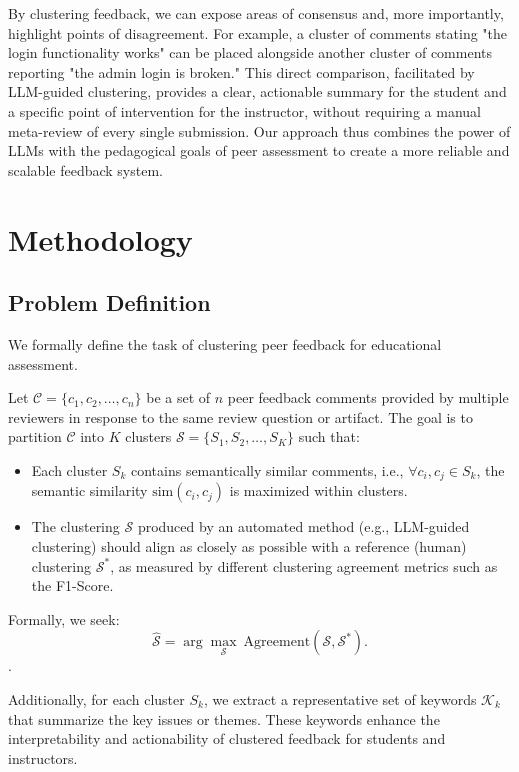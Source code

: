 \documentclass[manuscript,review, anonymous]{acmart}
\begin{document}
By clustering feedback, we can expose areas of consensus and, more importantly, highlight points of disagreement. For example, a cluster of comments stating "the login functionality works" can be placed alongside another cluster of comments reporting "the admin login is broken." This direct comparison, facilitated by LLM-guided clustering, provides a clear, actionable summary for the student and a specific point of intervention for the instructor, without requiring a manual meta-review of every single submission. Our approach thus combines the power of LLMs with the pedagogical goals of peer assessment to create a more reliable and scalable feedback system.

\section{Methodology}
\subsection{Problem Definition}
We formally define the task of clustering peer feedback for educational assessment. 


Let $\mathcal{C} = \{c_1, c_2, \ldots, c_n\}$ be a set of $n$ peer feedback comments provided by multiple reviewers in response to the same review question or artifact. The goal is to partition $\mathcal{C}$ into $K$ clusters $\mathcal{S} = \{S_1, S_2, \ldots, S_K\}$ such that:

\begin{itemize}
    \item Each cluster $S_k$ contains semantically similar comments, i.e., $\forall c_i, c_j \in S_k$, the semantic similarity $\mathrm{sim}(c_i, c_j)$ is maximized within clusters.
    \item The clustering $\mathcal{S}$ produced by an automated method (e.g., LLM-guided clustering) should align as closely as possible with a reference (human) clustering $\mathcal{S}^*$, as measured by different clustering agreement metrics such as the F1-Score.
\end{itemize}

Formally, we seek:
\[
\hat{\mathcal{S}} = \arg\max_{\mathcal{S}} \ \mathrm{Agreement}(\mathcal{S}, \mathcal{S}^*).
\].

Additionally, for each cluster $S_k$, we extract a representative set of keywords $\mathcal{K}_k$ that summarize the key issues or themes. These keywords enhance the interpretability and actionability of clustered feedback for students and instructors.
\end{document}
